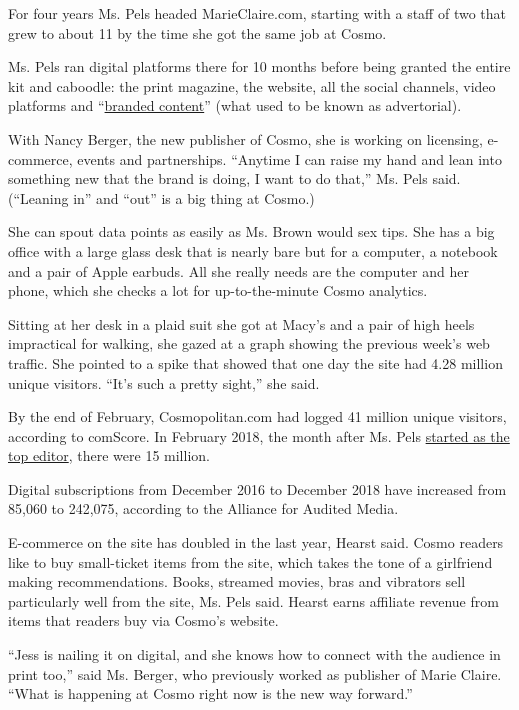 For four years Ms. Pels headed MarieClaire.com, starting with a staff of
two that grew to about 11 by the time she got the same job at Cosmo.

Ms. Pels ran digital platforms there for 10 months before being granted
the entire kit and caboodle: the print magazine, the website, all the
social channels, video platforms and
``\href{https://www.cosmopolitan.com/style-beauty/fashion/a26795655/how-to-use-stitch-fix/}{branded
content}'' (what used to be known as advertorial).

With Nancy Berger, the new publisher of Cosmo, she is working on
licensing, e-commerce, events and partnerships. ``Anytime I can raise my
hand and lean into something new that the brand is doing, I want to do
that,'' Ms. Pels said. (``Leaning in'' and ``out'' is a big thing at
Cosmo.)

She can spout data points as easily as Ms. Brown would sex tips. She has
a big office with a large glass desk that is nearly bare but for a
computer, a notebook and a pair of Apple earbuds. All she really needs
are the computer and her phone, which she checks a lot for
up-to-the-minute Cosmo analytics.

Sitting at her desk in a plaid suit she got at Macy's and a pair of high
heels impractical for walking, she gazed at a graph showing the previous
week's web traffic. She pointed to a spike that showed that one day the
site had 4.28 million unique visitors. ``It's such a pretty sight,'' she
said.

By the end of February, Cosmopolitan.com had logged 41 million unique
visitors, according to comScore. In February 2018, the month after Ms.
Pels
\href{https://www.adweek.com/digital/how-cosmopolitans-digital-director-is-opening-doors-to-new-coverage/}{started
as the top editor}, there were 15 million.

Digital subscriptions from December 2016 to December 2018 have increased
from 85,060 to 242,075, according to the Alliance for Audited Media.

E-commerce on the site has doubled in the last year, Hearst said. Cosmo
readers like to buy small-ticket items from the site, which takes the
tone of a girlfriend making recommendations. Books, streamed movies,
bras and vibrators sell particularly well from the site, Ms. Pels said.
Hearst earns affiliate revenue from items that readers buy via Cosmo's
website.

``Jess is nailing it on digital, and she knows how to connect with the
audience in print too,'' said Ms. Berger, who previously worked as
publisher of Marie Claire. ``What is happening at Cosmo right now is the
new way forward.''

